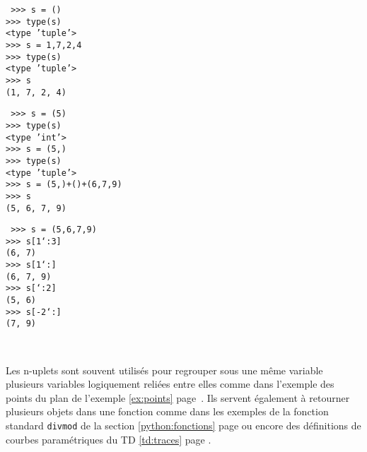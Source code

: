 \noindent\mbox{}\hspace*{1cm}\begin{py}{4cm}\tt
>>> s = ()\\
>>> type(s)\\
<type 'tuple'>\\
>>> s = 1,7,2,4\\
>>> type(s)\\
<type 'tuple'>\\
>>> s\\
(1, 7, 2, 4)
\end{py}
\hfill
\begin{py}{4cm}\tt
>>> s = (5)\\
>>> type(s)\\
<type 'int'>\\
>>> s = (5,)\\
>>> type(s)\\
<type 'tuple'>\\
>>> s = (5,)+()+(6,7,9)\\
>>> s\\
(5, 6, 7, 9)
\end{py}
\hfill
\begin{py}{4cm}\tt
>>> s = (5,6,7,9)\\
>>> s[1\char`:3]\\
(6, 7)\\
>>> s[1\char`:]\\
(6, 7, 9)\\
>>> s[\char`:2]\\
(5, 6)\\
>>> s[-2\char`:]\\
(7, 9)
\end{py}\\

\vspace*{2mm}

Les n-uplets sont souvent utilisés pour regrouper sous une même variable
plusieurs variables logiquement reliées entre elles comme dans l'exemple
des points du plan de l'exemple \ref{ex:points} page~\pageref{ex:points}.
Ils servent également à retourner plusieurs objets dans une fonction
comme dans les exemples de la fonction standard {\tt divmod} de la section
\ref{python:fonctions} page \pageref{python:fonctions} ou encore des 
définitions de courbes paramétriques du TD \ref{td:traces} page 
\pageref{td:traces}.

